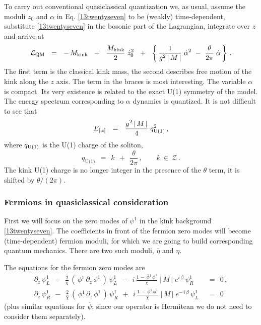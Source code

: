 \documentclass[epsfig,12pt]{article}
\def\beq{\begin{equation}}
\def\eeq{\end{equation}}
\def\beq{\begin{equation}}
\def\eeq{\end{equation}}
\newcommand{\p}{\partial}
\newcommand{\ov}{\overline}
\newcommand{\mc}[1]{\mathcal{#1}}
\newcommand{\bpsi}{\ov{\psi}{}}
\newcommand{\bphi}{\ov{\phi}{}}
\begin{document}
	To carry out  conventional
	quasiclassical quantization we, as usual,
	assume the moduli $ z_0 $ and $ \alpha $ in Eq. \eqref{13twentyseven}
	to be (weakly) time-dependent, substitute  \eqref{13twentyseven}
	in the bosonic part of the Lagrangian, integrate over $ z $
	and arrive at
\beq
{\cal L}_{\rm QM}  ~~=~~  -\,M_{\rm kink}  ~~+~~  \frac{M_{\rm kink}}{2}\; \dot z_0^2 ~~+~~  
			\left\{\,
				\frac{1}{g^2\,|\, M \,|}\; \dot\alpha^2  ~-~
				\frac{\theta}{2\pi}\;\dot\alpha
			\,\right\}\,.
\label{13twentynine}
\eeq
	The first term is the classical kink mass, the second describes
	free motion of the kink along the $z$ axis.
	The term in the braces is most interesting.
	The variable $ \alpha $ is compact.
	Its very existence is related to the exact U(1) symmetry of the model.
	The energy spectrum corresponding
	to $ \alpha $ dynamics is quantized.
	It is not difficult to see that
\beq
E_{[\alpha ]}  ~~=~~ \frac{g^2\, |\, M \,|}{4}\; q_{\rm U(1)}^2\,,
\label{13thirty}
\eeq
	where 
$ q_{\rm U(1)} $ 
	is the U(1) charge of the soliton,
\beq
	q_\text{U(1)} ~~=~~ k ~~+~~ \frac{\theta}{2\pi}\,,\qquad k ~\in~ \mc{Z}\,.
\label{13thirtyone}
\eeq
	The kink U(1) charge is no longer integer
	in the presence of the $\theta$ term, it is shifted by $\theta/(2\pi )$.


\subsubsection{Fermions in quasiclassical consideration}

	First we will  focus on the 
	zero modes of $\psi^1$ in the kink background \eqref{13twentyseven}.
	The coefficients
	in front of the fermion zero modes will become (time-dependent)
	 fermion moduli, for which we are going to build
	corresponding quantum mechanics. 
	There are two such moduli, $\bar\eta$ and $\eta$.

	The equations for the fermion zero modes are
\begin{align}
	\p_z\,\psi_L^1  ~~-~~  
	\frac{2}{\chi}\, 
	\left(\, \bphi^1\, \p_z\, \phi^1 \,\right) \,\psi_L^1  ~~-~~
	i\,\frac{1 \,-\, \bphi^1\, \phi^1}{\chi}\; |\, M \,|\; e^{i\, \beta} \,\psi_R^1
	&  ~~=~~  0\,,
\nonumber
	\\[3mm]
	\p_z\,\psi_R^1  ~~-~~  
	\frac{2}{\chi}\, 
	\left(\, \bphi^1\, \p_z\, \phi^1 \,\right) \,\psi_R^1  ~~+~~  
	i\,\frac{1 \,-\, \bphi^1\, \phi^1}{\chi}\; |\, M \,|\; e^{-\, i\, \beta} \,\psi_L^1
	&  ~~=~~  0
\label{13fourtyfour}
\end{align}
	(plus similar equations for $\bpsi$; since our operator is 
	Hermitean we do not need to consider them separately).
\end{document}
